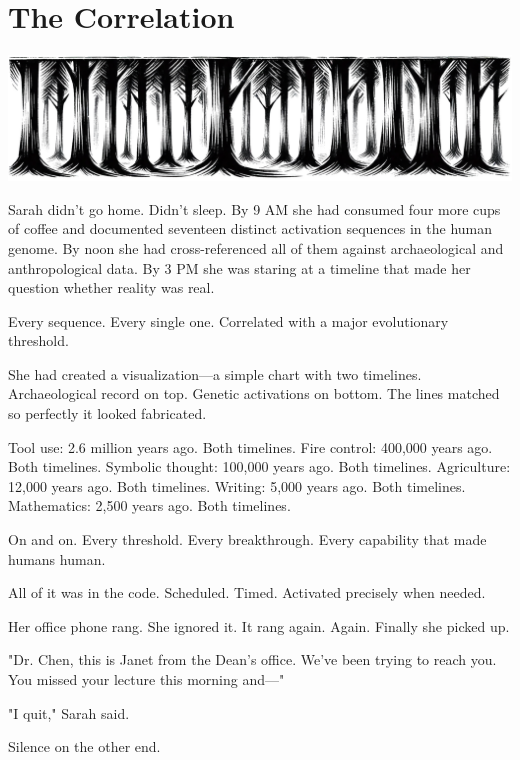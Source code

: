 \chapter{The Correlation}
\label{ch:17}



\begin{center}
\includegraphics[width=\textwidth]{images/chapterImages/genesis_sketch_00104_.png}
\end{center}

Sarah didn't go home. Didn't sleep. By 9 AM she had consumed four more cups of coffee and documented seventeen distinct activation sequences in the human genome. By noon she had cross-referenced all of them against archaeological and anthropological data. By 3 PM she was staring at a timeline that made her question whether reality was real.

Every sequence. Every single one. Correlated with a major evolutionary threshold.

She had created a visualization—a simple chart with two timelines. Archaeological record on top. Genetic activations on bottom. The lines matched so perfectly it looked fabricated.

Tool use: 2.6 million years ago. Both timelines.
Fire control: 400,000 years ago. Both timelines.
Symbolic thought: 100,000 years ago. Both timelines.
Agriculture: 12,000 years ago. Both timelines.
Writing: 5,000 years ago. Both timelines.
Mathematics: 2,500 years ago. Both timelines.

On and on. Every threshold. Every breakthrough. Every capability that made humans human.

All of it was in the code. Scheduled. Timed. Activated precisely when needed.

Her office phone rang. She ignored it. It rang again. Again. Finally she picked up.

"Dr. Chen, this is Janet from the Dean's office. We've been trying to reach you. You missed your lecture this morning and—"

"I quit," Sarah said.

Silence on the other end.


